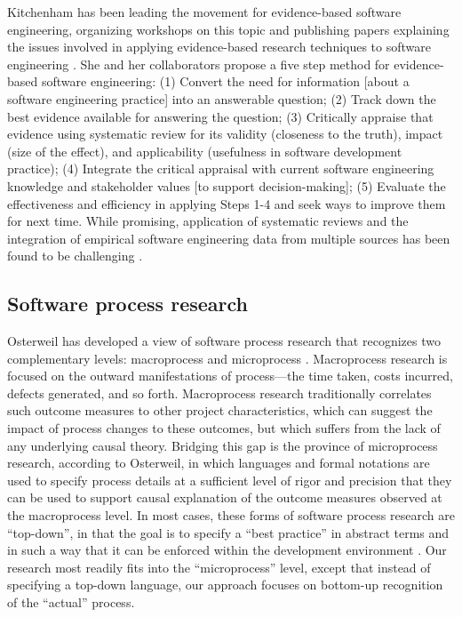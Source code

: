 Kitchenham has been leading the movement for evidence-based software
engineering, organizing workshops on this topic and publishing papers
explaining the issues involved in applying evidence-based research
techniques to software engineering \cite{Kitchenham04,Kitchenham04a}.  She
and her collaborators propose a five step method for evidence-based
software engineering: (1) Convert the need for information [about a
software engineering practice] into an answerable question; (2) Track down
the best evidence available for answering the question; (3) Critically
appraise that evidence using systematic review for its validity (closeness
to the truth), impact (size of the effect), and applicability (usefulness
in software development practice); (4) Integrate the critical appraisal
with current software engineering knowledge and stakeholder values [to
support decision-making]; (5) Evaluate the effectiveness and efficiency in
applying Steps 1-4 and seek ways to improve them for next time.  While
promising, application of systematic reviews and the integration of
empirical software engineering data from multiple sources has been found to
be challenging \cite{Jedlitschka04}.

\subsection{Software process research}

Osterweil has developed a view of software process research that recognizes
two complementary levels: macroprocess and microprocess \cite{Osterweil05}.
Macroprocess research is focused on the outward manifestations of
process---the time taken, costs incurred, defects generated, and so
forth. Macroprocess research traditionally correlates such outcome measures
to other project characteristics, which can suggest the impact of process
changes to these outcomes, but which suffers from the lack of any
underlying causal theory.  Bridging this gap is the province of
microprocess research, according to Osterweil, in which languages and
formal notations are used to specify process details at a sufficient level
of rigor and precision that they can be used to support causal explanation
of the outcome measures observed at the macroprocess level. In most cases,
these forms of software process research are ``top-down'', in that the goal
is to specify a ``best practice'' in abstract terms and in such a way that
it can be enforced within the development environment \cite{Shepard92,Jager99,DiNitto2002,Cass2000,Schlenoff00,Sutton97}.  
Our research most
readily fits into the ``microprocess'' level, except that instead of
specifying a top-down language, our approach focuses on bottom-up
recognition of the ``actual'' process. 

